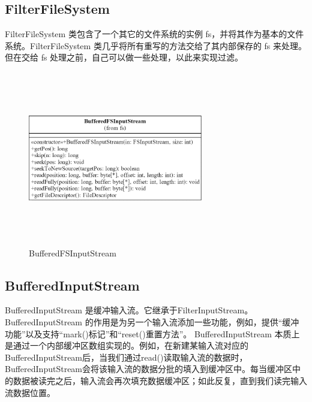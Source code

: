 	\subsection{FilterFileSystem} 
	FilterFileSystem 类包含了一个其它的文件系统的实例 fs，并将其作为基本的文件系统。FilterFileSystem 类几乎将所有重写的方法交给了其内部保存的 fs 来处理。但在交给 fs 处理之前，自己可以做一些处理，以此来实现过滤。
	\begin{figure}[H]
		\centering
		\includegraphics[width=3in,height=3in]{BufferedFSInputStream.png}
		\caption{BufferedFSInputStream}
		\label{fig:graph8}
	\end{figure}
	
	\subsection{BufferedInputStream} 
	BufferedInputStream 是缓冲输入流。它继承于FilterInputStream。
	BufferedInputStream 的作用是为另一个输入流添加一些功能，例如，提供“缓冲功能”以及支持“mark()标记”和“reset()重置方法”。
	BufferedInputStream 本质上是通过一个内部缓冲区数组实现的。例如，在新建某输入流对应的BufferedInputStream后，当我们通过read()读取输入流的数据时，BufferedInputStream会将该输入流的数据分批的填入到缓冲区中。每当缓冲区中的数据被读完之后，输入流会再次填充数据缓冲区；如此反复，直到我们读完输入流数据位置。
	
	\endinput